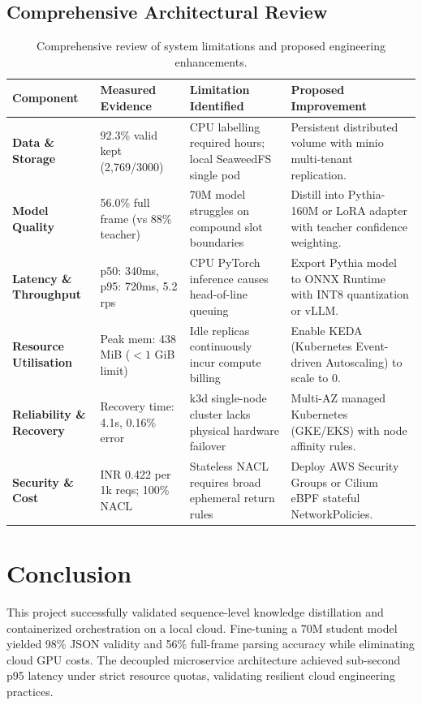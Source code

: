 \documentclass[10pt,a4paper]{article}
\begin{document}
\subsection{Comprehensive Architectural Review}
\begin{table}[h!]
\centering
\footnotesize
\begin{tabular}{p{2.6cm}p{2.8cm}p{4.2cm}p{4.5cm}}
\toprule
\textbf{Component} & \textbf{Measured Evidence} & \textbf{Limitation Identified} & \textbf{Proposed Improvement} \\
\midrule
\textbf{Data \& Storage} & 92.3\% valid kept (2,769/3000) & CPU labelling required hours; local SeaweedFS single pod & Persistent distributed volume with minio multi-tenant replication. \\
\textbf{Model Quality} & 56.0\% full frame (vs 88\% teacher) & 70M model struggles on compound slot boundaries & Distill into Pythia-160M or LoRA adapter with teacher confidence weighting. \\
\textbf{Latency \& Throughput} & p50: 340ms, p95: 720ms, 5.2 rps & CPU PyTorch inference causes head-of-line queuing & Export Pythia model to ONNX Runtime with INT8 quantization or vLLM. \\
\textbf{Resource Utilisation} & Peak mem: 438 MiB ($<1$ GiB limit) & Idle replicas continuously incur compute billing & Enable KEDA (Kubernetes Event-driven Autoscaling) to scale to 0. \\
\textbf{Reliability \& Recovery} & Recovery time: 4.1s, 0.16\% error & k3d single-node cluster lacks physical hardware failover & Multi-AZ managed Kubernetes (GKE/EKS) with node affinity rules. \\
\textbf{Security \& Cost} & INR 0.422 per 1k reqs; 100\% NACL & Stateless NACL requires broad ephemeral return rules & Deploy AWS Security Groups or Cilium eBPF stateful NetworkPolicies. \\
\bottomrule
\end{tabular}
\caption{Comprehensive review of system limitations and proposed engineering enhancements.}
\label{tab:review_matrix}
\end{table}

\section{Conclusion}
This project successfully validated sequence-level knowledge distillation and containerized orchestration on a local cloud. Fine-tuning a 70M student model yielded 98\% JSON validity and 56\% full-frame parsing accuracy while eliminating cloud GPU costs. The decoupled microservice architecture achieved sub-second p95 latency under strict resource quotas, validating resilient cloud engineering practices.
\end{document}

